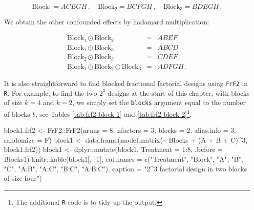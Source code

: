 \documentclass[
]{book}
\newenvironment{Shaded}{\begin{snugshade}}{\end{snugshade}}
\newcommand{\AttributeTok}[1]{\textcolor[rgb]{0.77,0.63,0.00}{#1}}
\newcommand{\DecValTok}[1]{\textcolor[rgb]{0.00,0.00,0.81}{#1}}
\newcommand{\FunctionTok}[1]{\textcolor[rgb]{0.00,0.00,0.00}{#1}}
\newcommand{\NormalTok}[1]{#1}
\newcommand{\OtherTok}[1]{\textcolor[rgb]{0.56,0.35,0.01}{#1}}
\newcommand{\SpecialCharTok}[1]{\textcolor[rgb]{0.00,0.00,0.00}{#1}}
\newcommand{\StringTok}[1]{\textcolor[rgb]{0.31,0.60,0.02}{#1}}
\theoremstyle{definition}
\theoremstyle{definition}
\theoremstyle{definition}
\theoremstyle{definition}
\theoremstyle{remark}
\begin{document}
\[
\mathrm{Block}_{1}=ACEGH\,,\quad \mathrm{Block}_{2}=BCFGH\,,\quad \mathrm{Block}_{3}= BDEGH\,.
\]

We obtain the other confounded effects by hadamard multiplication:

\begin{eqnarray}
\mathrm{Block}_{1}\odot \mathrm{Block}_{2} & = & ABEF \nonumber\\
\mathrm{Block}_{1}\odot \mathrm{Block}_{3} & = & ABCD \nonumber\\
\mathrm{Block}_{2}\odot \mathrm{Block}_{3} & = & CDEF \nonumber\\
\mathrm{Block}_{1}\odot \mathrm{Block}_{2} \odot \mathrm{Block}_{3} & = & ADFGH\,. \nonumber
\end{eqnarray}

It is also straightforward to find blocked fractional factorial designs using \texttt{FrF2} in \texttt{R}. For example, to find the two \(2^3\) designs at the start of this chapter, with blocks of size \(k=4\) and \(k=2\), we simply set the \texttt{blocks} argument equal to the number of blocks \(b\), see Tables \ref{tab:frf2-block-1} and \ref{tab:frf2-block-2}\footnote{The additional \texttt{R} code is to tidy up the output.}.

\begin{Shaded}
\begin{Highlighting}[]
\NormalTok{block1.frf2 }\OtherTok{\textless{}{-}}\NormalTok{ FrF2}\SpecialCharTok{::}\FunctionTok{FrF2}\NormalTok{(}\AttributeTok{nruns =} \DecValTok{8}\NormalTok{, }\AttributeTok{nfactors =} \DecValTok{3}\NormalTok{, }\AttributeTok{blocks =} \DecValTok{2}\NormalTok{, }
                          \AttributeTok{alias.info =} \DecValTok{3}\NormalTok{, }\AttributeTok{randomize =}\NormalTok{ F)}
\NormalTok{block1 }\OtherTok{\textless{}{-}} \FunctionTok{data.frame}\NormalTok{(}\FunctionTok{model.matrix}\NormalTok{(}\SpecialCharTok{\textasciitilde{}}\NormalTok{ Blocks }\SpecialCharTok{+}\NormalTok{ (A }\SpecialCharTok{+}\NormalTok{ B }\SpecialCharTok{+}\NormalTok{ C)}\SpecialCharTok{\^{}}\DecValTok{3}\NormalTok{, block1.frf2))}
\NormalTok{block1 }\OtherTok{\textless{}{-}}\NormalTok{ dplyr}\SpecialCharTok{::}\FunctionTok{mutate}\NormalTok{(block1, }\AttributeTok{Treatment =} \DecValTok{1}\SpecialCharTok{:}\DecValTok{8}\NormalTok{, }\AttributeTok{.before =}\NormalTok{ Blocks1)}
\NormalTok{knitr}\SpecialCharTok{::}\FunctionTok{kable}\NormalTok{(block1[, }\SpecialCharTok{{-}}\DecValTok{1}\NormalTok{], }\AttributeTok{col.names =} \FunctionTok{c}\NormalTok{(}\StringTok{"Treatment"}\NormalTok{, }\StringTok{"Block"}\NormalTok{, }\StringTok{"A"}\NormalTok{, }\StringTok{"B"}\NormalTok{, }\StringTok{"C"}\NormalTok{, }
                                         \StringTok{"A:B"}\NormalTok{, }\StringTok{"A:C"}\NormalTok{, }\StringTok{"B:C"}\NormalTok{, }\StringTok{"A:B:C"}\NormalTok{),}
             \AttributeTok{caption =} \StringTok{"$2\^{}3$ factorial design in two blocks of size four"}\NormalTok{)}
\end{Highlighting}
\end{Shaded}
\end{document}
